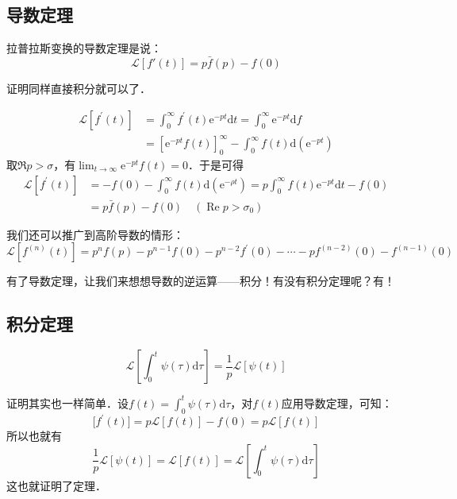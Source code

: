 \subsection{导数定理}

拉普拉斯变换的导数定理是说：
\begin{equation}
\mathscr L[f'(t)]=p\bar f(p)-f(0)
\end{equation}

证明同样直接积分就可以了．

\begin{equation}
\begin{aligned} \mathscr L[f^{\prime}(t)] & = \int_{0}^{\infty} f^{\prime}(t) \mathrm{e}^{-p t} \mathrm{d} t=\int_{0}^{\infty} \mathrm{e}^{-p t} \mathrm{d} f \\ &=\left[\mathrm{e}^{-p t} f(t)\right]_{0}^{\infty}-\int_{0}^{\infty} f(t) \mathrm{d}\left(\mathrm{e}^{-p t}\right) \end{aligned}
\end{equation}
取$\Re p>\sigma$，有$\lim_{t\to\infty}\mathrm{e}^{-pt}f(t)=0$．于是可得
\begin{equation}
\begin{aligned} \mathscr L[f^{\prime}(t)] & = -f(0)-\int_{0}^{\infty} f(t) \mathrm{d}\left(\mathrm{e}^{-\rho t}\right)=p \int_{0}^{\infty} f(t) \mathrm{e}^{-p t} \mathrm{d} t-f(0) \\ &=p \bar{f}(p)-f(0) \quad\left(\operatorname{Re} p>\sigma_{0}\right) \end{aligned}
\end{equation}

我们还可以推广到高阶导数的情形：
\begin{equation}
\mathscr L[f^{(n)}(t)] = p^{n} f(p)-p^{n-1} f(0)-p^{n-2} f^{\prime}(0)-\cdots-p f^{(n-2)}(0)-f^{(n-1)}(0)
\end{equation} 

有了导数定理，让我们来想想导数的逆运算——积分！有没有积分定理呢？有！

\subsection{积分定理}
\begin{equation}
\mathscr L\left[\int_{0}^{t} \psi(\tau) \mathrm{d} \tau \right]=\frac{1}{p} \mathscr{L}[\psi(t)]
\end{equation}

证明其实也一样简单．设$\displaystyle f(t)=\int_{0}^{t} \psi(\tau) \mathrm{d} \tau$，对$f(t)$应用导数定理，可知：
\begin{equation}
\mathscr[f^{\prime}(t)]=p \mathscr{L}[f(t)]-f(0)=p \mathscr{L}[f(t)]
\end{equation}
所以也就有
\begin{equation}
\frac{1}{p} \mathscr{L}[\psi(t)]=\mathscr{L}[f(t)]=\mathscr{L}\left[\int_{0}^{t} \psi(\tau) \mathrm{d} \tau\right]
\end{equation}
这也就证明了定理．
 
